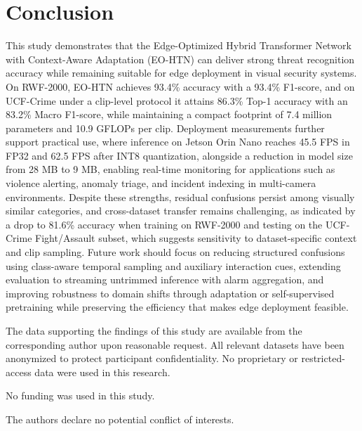 \documentclass[AMA,Times1COL]{WileyNJDv5} %
\begin{document}
\section{Conclusion}
This study demonstrates that the Edge-Optimized Hybrid Transformer Network with Context-Aware Adaptation (EO-HTN) can deliver strong threat recognition accuracy while remaining suitable for edge deployment in visual security systems. On RWF-2000, EO-HTN achieves 93.4\% accuracy with a 93.4\% F1-score, and on UCF-Crime under a clip-level protocol it attains 86.3\% Top-1 accuracy with an 83.2\% Macro F1-score, while maintaining a compact footprint of 7.4 million parameters and 10.9 GFLOPs per clip. Deployment measurements further support practical use, where inference on Jetson Orin Nano reaches 45.5 FPS in FP32 and 62.5 FPS after INT8 quantization, alongside a reduction in model size from 28 MB to 9 MB, enabling real-time monitoring for applications such as violence alerting, anomaly triage, and incident indexing in multi-camera environments. Despite these strengths, residual confusions persist among visually similar categories, and cross-dataset transfer remains challenging, as indicated by a drop to 81.6\% accuracy when training on RWF-2000 and testing on the UCF-Crime Fight/Assault subset, which suggests sensitivity to dataset-specific context and clip sampling. Future work should focus on reducing structured confusions using class-aware temporal sampling and auxiliary interaction cues, extending evaluation to streaming untrimmed inference with alarm aggregation, and improving robustness to domain shifts through adaptation or self-supervised pretraining while preserving the efficiency that makes edge deployment feasible.











The data supporting the findings of this study are available from the corresponding author upon reasonable request. All relevant datasets have been anonymized to protect participant confidentiality. No proprietary or restricted-access data were used in this research.


No funding was used in this study.

The authors declare no potential conflict of interests.


\end{document}
